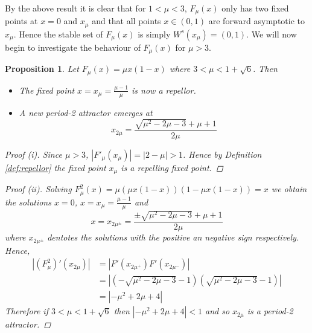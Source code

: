 \documentclass[11pt,a4paper,oneside]{memoir}
\theoremstyle{plain}
\newtheorem{prop}[thm]{Proposition}
\theoremstyle{definition}
\begin{document}
By the above result it is clear that for $1 < \mu < 3$, $F_\mu(x)$ only has two fixed points at $x = 0$ and $x_\mu$ and that all points $x \in (0, 1)$ are forward asymptotic to $x_\mu$. Hence the stable set of $F_\mu(x)$ is simply $W^s(x_\mu) = (0, 1)$. We will now begin to investigate the behaviour of $F_\mu(x)$ for $\mu > 3$.

\begin{prop} \label{prop:logistic3}
    Let $F_\mu(x) = \mu x (1-x)$ where $3 < \mu < 1 + \sqrt{6}$. Then
    \begin{itemize}
        \item[(i)] The fixed point $x = x_\mu = \frac{\mu - 1}{\mu}$ is now a repellor.
        \item[(ii)] A new period-2 attractor emerges at \[x_{2\mu} = \frac{\sqrt{\mu^2 - 2\mu - 3} + \mu + 1}{2\mu}\]
    \end{itemize}
    \begin{proof}[Proof (i)]
        Since $\mu > 3$, $|F'_\mu(x_\mu)| = |2-\mu| > 1$. Hence by Definition \ref{def:repellor} the fixed point $x_\mu$ is a repelling fixed point.
    \end{proof}
    \begin{proof}[Proof (ii)]
        Solving $F^2_\mu(x) = \mu(\mu x(1-x))(1-\mu x(1-x)) = x$ we obtain the solutions $x = 0$, $x = x_\mu = \frac{\mu - 1}{\mu}$ and \[x = x_{2\mu^\pm} = \frac{\pm\sqrt{\mu^2 - 2\mu - 3} + \mu + 1}{2\mu}\] where $x_{2\mu^\pm}$ dentotes the solutions with the positive an negative sign respectively. Hence,
        \begin{align*}
        \left\lvert (F_\mu^2)'(x_{2\mu})\right\rvert &= \left\lvert F'(x_{2\mu^+}) F'(x_{2\mu^-}) \right\rvert \\ &= \left\lvert \left( - \sqrt{\mu^2 - 2\mu - 3} - 1 \right) \left( \sqrt{\mu^2 - 2\mu - 3} - 1\right) \right\rvert \\ &= \left\lvert -\mu^2 + 2\mu + 4 \right\rvert
        \end{align*}
        Therefore if $3 < \mu < 1 + \sqrt{6}$ then $\left\lvert -\mu^2 + 2\mu + 4 \right\rvert < 1$ and so $x_{2\mu}$ is a period-2 attractor.
    \end{proof}
\end{prop}
\end{document}
